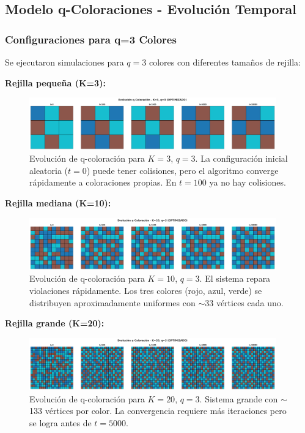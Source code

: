 \subsection{Modelo q-Coloraciones - Evolución Temporal}

\subsubsection{Configuraciones para q=3 Colores}

Se ejecutaron simulaciones para $q=3$ colores con diferentes tamaños de rejilla:

\textbf{Rejilla pequeña (K=3):}

\begin{figure}[H]
\centering
\includegraphics[width=0.95\textwidth]{../images/coloracion_evolucion_K3_q3.png}
\caption{Evolución de q-coloración para $K=3$, $q=3$. La configuración inicial aleatoria ($t=0$) puede tener colisiones, pero el algoritmo converge rápidamente a coloraciones propias. En $t=100$ ya no hay colisiones.}
\end{figure}

\textbf{Rejilla mediana (K=10):}

\begin{figure}[H]
\centering
\includegraphics[width=0.95\textwidth]{../images/coloracion_evolucion_K10_q3.png}
\caption{Evolución de q-coloración para $K=10$, $q=3$. El sistema repara violaciones rápidamente. Los tres colores (rojo, azul, verde) se distribuyen aproximadamente uniformes con $\sim$33 vértices cada uno.}
\end{figure}

\textbf{Rejilla grande (K=20):}

\begin{figure}[H]
\centering
\includegraphics[width=0.95\textwidth]{../images/coloracion_evolucion_K20_q3.png}
\caption{Evolución de q-coloración para $K=20$, $q=3$. Sistema grande con $\sim$133 vértices por color. La convergencia requiere más iteraciones pero se logra antes de $t=5000$.}
\end{figure}

